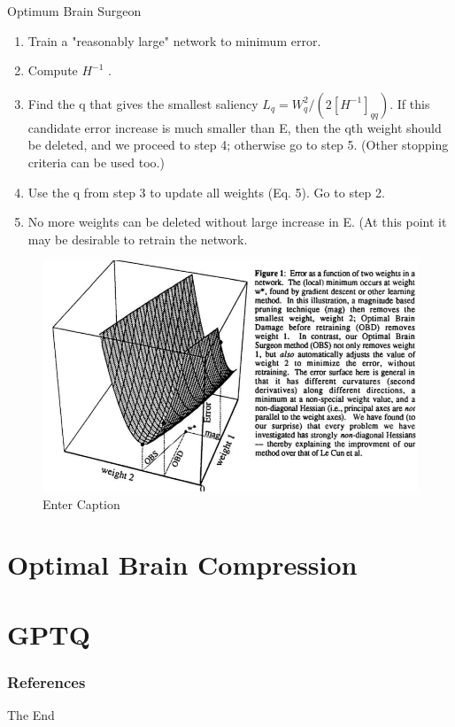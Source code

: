 \documentclass{beamer}
\theoremstyle{plain}
\theoremstyle{definition}
\theoremstyle{remark}
\numberwithin{equation}{section}
\numberwithin{figure}{section}
\numberwithin{theorem}{section}
\begin{document}
\begin{frame}{Optimum Brain Surgeon}
\begin{enumerate}
    \item Train a "reasonably large" network to minimum error.
    \item Compute $H^{-1}$ .
    \item Find the q that gives the smallest saliency $L_q = W_q^2/(2[H^{-1}]_{qq})$. If this candidate error
            increase is much smaller than E, then the qth weight should be deleted, and we
            proceed to step 4; otherwise go to step 5. (Other stopping criteria can be used too.)
    \item Use the q from step 3 to update all weights (Eq. 5). Go to step 2.
    \item No more weights can be deleted without large increase in E. (At this point it may be
desirable to retrain the network.
\end{enumerate}
\end{frame}
\begin{frame}[OBS]
\begin{figure}
    \centering
    \includegraphics[width=0.9\linewidth]{obs.png}
    \caption{Enter Caption}
    \label{fig:enter-label}
\end{figure}
\end{frame}
\section{Optimal Brain Compression}
\section{GPTQ}



\begin{frame}[t, allowframebreaks]
\frametitle{References}
%
%
\end{frame}


\begin{frame}
\Huge{\centerline{The End}}
\end{frame}

\end{document}
